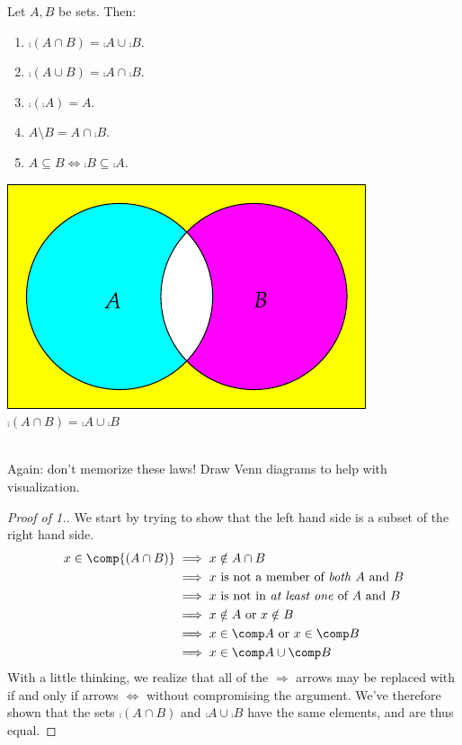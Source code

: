\noindent\begin{minipage}{0.62\textwidth}
\begin{thmm}\label{thm:setcomp}
Let $A,B$ be sets. Then:
\begin{enumerate}\setlength{\itemsep}{0pt}
\item $\comp{(A\cap B)}=\comp A\cup \comp B$.
\item $\comp{(A\cup B)}=\comp A\cap \comp B$.
\item $\comp{(\comp A)}=A$.
\item $A\setminus B=A\cap\comp B$.
\item $A\subseteq B\iff \comp B\subseteq \comp A$.
\end{enumerate}
\end{thmm}
\end{minipage}\qquad
\begin{minipage}{0.33\textwidth}\centering
\includegraphics[width=\textwidth]{sets-08-venndemorgan}\\
$\comp{(A\cap B)}=\comp A\cup \comp B$
\end{minipage}\\[5pt]

\noindent Again: don't memorize these laws! Draw Venn diagrams to help with visualization. 

\begin{proof}[Proof of 1.]
We start by trying to show that the left hand side is a subset of the right hand side.
\begin{align*}
x\in\comp{(A\cap B)}&\implies x\notin A\cap B\\
&\implies x\text{ is not a member of \emph{both} $A$ and $B$}\\
&\implies x\text{ is not in \emph{at least one} of $A$ and $B$}\\
&\implies x\notin A\text{ or }x\notin B\\
&\implies x\in\comp A\text{ or }x\in\comp B\\
&\implies x\in\comp A\cup\comp B
\end{align*}
With a little thinking, we realize that all of the $\Longrightarrow$ arrows may be replaced with if and only if arrows $\Longleftrightarrow$ without compromising the argument. We've therefore shown that the sets $\comp{(A\cap B)}$ and $\comp A\cup \comp B$ have the same elements, and are thus equal.
\end{proof}

